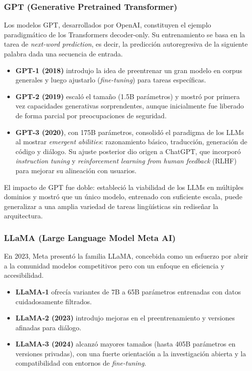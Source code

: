 \subsubsection{GPT (Generative Pretrained Transformer)}

Los modelos GPT, desarrollados por OpenAI, constituyen el ejemplo paradigm\'atico de los Transformers decoder-only. Su entrenamiento se basa en la tarea de \textit{next-word prediction}, es decir, la predicci\'on autoregresiva de la siguiente palabra dada una secuencia de entrada.

\begin{itemize}
    \item \textbf{GPT-1 (2018)} introdujo la idea de preentrenar un gran modelo en corpus generales y luego ajustarlo (\textit{fine-tuning}) para tareas espec\'ificas.
    \item \textbf{GPT-2 (2019)} escal\'o el tama\~no (1.5B par\'ametros) y mostr\'o por primera vez capacidades generativas sorprendentes, aunque inicialmente fue liberado de forma parcial por preocupaciones de seguridad.
    \item \textbf{GPT-3 (2020)}, con 175B par\'ametros, consolid\'o el paradigma de los LLMs al mostrar \textit{emergent abilities}: razonamiento b\'asico, traducci\'on, generaci\'on de c\'odigo y di\'alogo. Su ajuste posterior dio origen a ChatGPT, que incorpor\'o \textit{instruction tuning} y \textit{reinforcement learning from human feedback} (RLHF) para mejorar su alineaci\'on con usuarios.
\end{itemize}

El impacto de GPT fue doble: estableci\'o la viabilidad de los LLMs en m\'ultiples dominios y mostr\'o que un \'unico modelo, entrenado con suficiente escala, puede generalizar a una amplia variedad de tareas ling\"u\'isticas sin redise\~nar la arquitectura.

\subsubsection{LLaMA (Large Language Model Meta AI)}

En 2023, Meta present\'o la familia LLaMA, concebida como un esfuerzo por abrir a la comunidad modelos competitivos pero con un enfoque en eficiencia y accesibilidad.

\begin{itemize}
    \item \textbf{LLaMA-1} ofrec\'ia variantes de 7B a 65B par\'ametros entrenadas con datos cuidadosamente filtrados.
    \item \textbf{LLaMA-2 (2023)} introdujo mejoras en el preentrenamiento y versiones afinadas para di\'alogo.
    \item \textbf{LLaMA-3 (2024)} alcanz\'o mayores tama\~nos (hasta 405B par\'ametros en versiones privadas), con una fuerte orientaci\'on a la investigaci\'on abierta y la compatibilidad con entornos de \textit{fine-tuning}.
\end{itemize}

